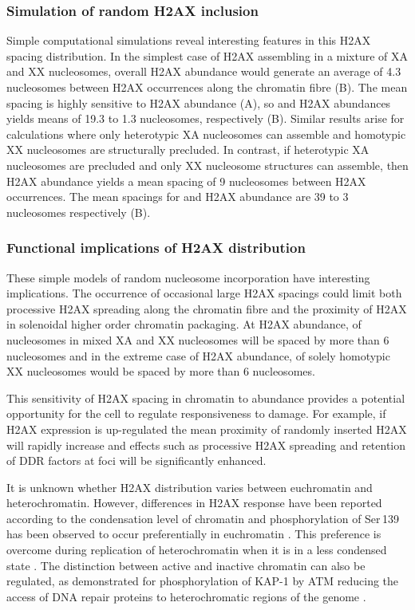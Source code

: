\subsubsection{Simulation of random H2AX inclusion}
Simple computational simulations reveal interesting features in this
H2AX spacing distribution. In the simplest case of H2AX assembling in
a mixture of XA and XX nucleosomes,  overall H2AX abundance
would generate an average of 4.3 nucleosomes between H2AX occurrences
along the chromatin fibre (B). The
mean spacing is highly sensitive to H2AX abundance
(A), so  and 
H2AX abundances yields means of 19.3 to 1.3 nucleosomes, respectively
(B). Similar results arise for
calculations where only heterotypic XA nucleosomes can assemble and
homotypic XX nucleosomes are structurally precluded. In contrast, if
heterotypic XA nucleosomes are precluded and only XX nucleosome
structures can assemble, then  H2AX abundance yields a mean
spacing of 9 nucleosomes between H2AX occurrences. The mean spacings
for  and  H2AX abundance are 39 to 3 nucleosomes
respectively (B).

\subsubsection{Functional implications of H2AX distribution}
These simple models of random nucleosome incorporation have
interesting implications. The occurrence of occasional large H2AX
spacings could limit both processive \textgamma H2AX spreading along
the chromatin fibre and the proximity of H2AX in solenoidal higher
order chromatin packaging. At  H2AX abundance,  of
nucleosomes in mixed XA and XX nucleosomes will be spaced by more than
6 nucleosomes and in the extreme case of  H2AX abundance,
 of solely homotypic XX nucleosomes would be spaced by more
than 6 nucleosomes.

This sensitivity of H2AX spacing in chromatin to abundance provides a
potential opportunity for the cell to regulate responsiveness to
damage. For example, if H2AX expression is up-regulated the mean
proximity of randomly inserted H2AX will rapidly increase and effects
such as processive \textgamma H2AX spreading and retention of DDR
factors at foci will be significantly enhanced.

It is unknown whether H2AX distribution varies between euchromatin and
heterochromatin. However, differences in H2AX response have been
reported according to the condensation level of chromatin and
phosphorylation of Ser\,139 has been observed to occur preferentially
in euchromatin \citep{IGC+07}.
This preference is overcome during replication of heterochromatin when
it is in a less condensed state \citep{IGC+07}. The distinction
between active and inactive chromatin can also be regulated, as
demonstrated for phosphorylation of KAP-1 by ATM reducing the access
of DNA repair proteins to heterochromatic regions of the genome
\citep{AAG+08}.

